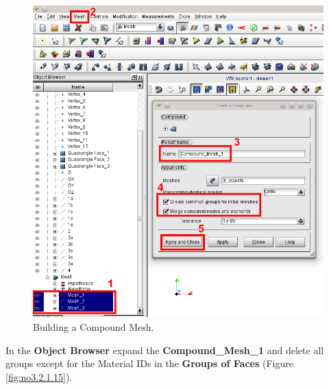\begin{figure}[tbp]
\begin{center}
\includegraphics[scale=0.50]{figures/SalomeStep5.png}
\caption{Building a Compound Mesh.}
\label{fig:no3.2.1.13}
\end{center}
\end{figure}

In the \textbf{Object Browser} expand the \textbf{Compound\_Mesh\_1} and delete all groups except for the Material IDs in the \textbf{Groups of Faces} (Figure \ref{fig:no3.2.1.15}).
        
